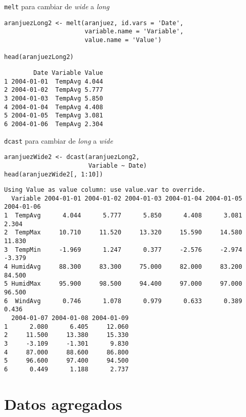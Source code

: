 \documentclass[xcolor={usenames,svgnames,dvipsnames}]{beamer}
\begin{document}
\begin{frame}[fragile,label={sec:orgce02042}]{\texttt{melt} para cambiar de \emph{wide} a \emph{long}}
 \lstset{language=r,label= ,caption= ,captionpos=b,numbers=none}
\begin{lstlisting}
aranjuezLong2 <- melt(aranjuez, id.vars = 'Date',
                      variable.name = 'Variable',
                      value.name = 'Value')

head(aranjuezLong2)
\end{lstlisting}

\begin{verbatim}
        Date Variable Value
1 2004-01-01  TempAvg 4.044
2 2004-01-02  TempAvg 5.777
3 2004-01-03  TempAvg 5.850
4 2004-01-04  TempAvg 4.408
5 2004-01-05  TempAvg 3.081
6 2004-01-06  TempAvg 2.304
\end{verbatim}
\end{frame}

\begin{frame}[fragile,label={sec:orgc79e352}]{\texttt{dcast} para cambiar de \emph{long} a \emph{wide}}
 \lstset{language=r,label= ,caption= ,captionpos=b,numbers=none}
\begin{lstlisting}
aranjuezWide2 <- dcast(aranjuezLong2,
                       Variable ~ Date)
head(aranjuezWide2[, 1:10])
\end{lstlisting}

\begin{verbatim}
Using Value as value column: use value.var to override.
  Variable 2004-01-01 2004-01-02 2004-01-03 2004-01-04 2004-01-05 2004-01-06
1  TempAvg      4.044      5.777      5.850      4.408      3.081      2.304
2  TempMax     10.710     11.520     13.320     15.590     14.580     11.830
3  TempMin     -1.969      1.247      0.377     -2.576     -2.974     -3.379
4 HumidAvg     88.300     83.300     75.000     82.000     83.200     84.500
5 HumidMax     95.900     98.500     94.400     97.000     97.000     96.500
6  WindAvg      0.746      1.078      0.979      0.633      0.389      0.436
  2004-01-07 2004-01-08 2004-01-09
1      2.080      6.405     12.060
2     11.500     13.380     15.330
3     -3.109     -1.301      9.830
4     87.000     88.600     86.800
5     96.600     97.400     94.500
6      0.449      1.188      2.737
\end{verbatim}
\end{frame}


\section{Datos agregados}
\label{sec:org1612f00}
\end{document}
